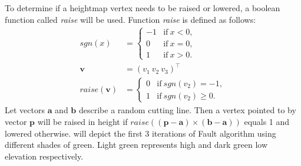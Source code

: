 \documentclass[11pt,a4paper,twoside,openright]{report}
\begin{document}
To determine if a heightmap vertex needs to be raised or lowered, a boolean function called \emph{raise} will be used. Function \emph{raise} is defined as follows:
\begin{align*}
sgn(x) &=
\begin{cases}
  -1 & \text{if}\ x < 0, \\
  0 & \text{if}\ x = 0, \\
  1 & \text{if}\ x > 0.
\end{cases} \\
\mathbf{v} &= (v_1\ v_2\ v_3)^\intercal \\
raise(\mathbf{v}) &=
\begin{cases}
  0 & \text{if}\ sgn(v_2) = -1, \\
  1 & \text{if}\ sgn(v_2) \geq 0.
\end{cases}
\end{align*}
Let vectors $\mathbf{a}$ and $\mathbf{b}$ describe a random cutting line. Then a vertex pointed to by vector $\mathbf{p}$ will be raised in height if $raise((\mathbf{p}-\mathbf{a}) \times (\mathbf{b} - \mathbf{a}))$ equals 1 and lowered otherwise.  will depict the first 3 iterations of Fault algorithm using different shades of green. Light green represents high and dark green low elevation respectively.
\end{document}
